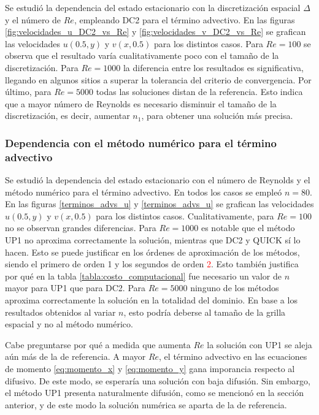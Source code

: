 \documentclass[aps,prb,twocolumn,superscriptaddress,floatfix,longbibliography,10pt]{revtex4-2}
\newif\ifptitle
\newif\ifpnumber
\newcounter{para}
\newcommand\ptitle[1]{\par\refstepcounter{para}
{\ifpnumber{\noindent\textcolor{lightgray}{\textbf{\thepara}}\indent}\fi}
{\ifptitle{\textbf{[{#1}]}}\fi}}
\begin{document}
\ptitle{Comparación DC2 vs n1 para distintos Re}
Se estudió la dependencia del estado estacionario con la discretización espacial $\Delta$ y el número de $Re$, empleando DC2 para el término advectivo. En las figuras \ref{fig:velocidades_u_DC2_vs_Re} y \ref{fig:velocidades_v_DC2_vs_Re} se grafican las velocidades $u(0.5,y)$ y $v(x,0.5)$ para los distintos casos. Para $Re = 100$ se observa que el resultado varía cualitativamente poco con el tamaño de la discretización. Para $Re = 1000$ la diferencia entre los resultados es significativa, llegando en algunos sitios a superar la tolerancia del criterio de convergencia. Por último, para $Re = 5000$ todas las soluciones distan de la referencia. Esto indica que a mayor número de Reynolds es necesario disminuir el tamaño de la discretización, es decir, aumentar $n_1$, para obtener una solución más precisa.

\subsubsection{Dependencia con el método numérico para el término advectivo \label{sec:termino_adv}}

\ptitle{Comparación cualitativa entre métodos numéricos para distintos Re}
Se estudió la dependencia del estado estacionario con el número de Reynolds y el método numérico para el término advectivo. En todos los casos se empleó $n = 80$. En las figuras \ref{terminos_advs_u} y \ref{terminos_advs_u} se grafican las velocidades $u(0.5,y)$ y $v(x,0.5)$ para los distintos casos. Cualitativamente, para $Re = 100$ no se observan grandes diferencias. Para $Re = 1000$ es notable que el método UP1 no aproxima correctamente la solución, mientras que DC2 y QUICK sí lo hacen. Esto se puede justificar en los órdenes de aproximación de los métodos, siendo el primero de orden 1 y los segundos de orden \textcolor{red}{2}. Esto también justifica por qué en la tabla \ref{tabla:costo_computacional} fue necesario un valor de $n$ mayor para UP1 que para DC2. Para $Re = 5000$ ninguno de los métodos aproxima correctamente la solución en la totalidad del dominio. En base a los resultados obtenidos al variar $n$, esto podría deberse al tamaño de la grilla espacial y no al método numérico.

Cabe preguntarse por qué a medida que aumenta $Re$ la solución con UP1 se aleja aún más de la de referencia. A mayor $Re$, el término advectivo en las ecuaciones de momento \ref{eq:momento_x} y \ref{eq:momento_y} gana imporancia respecto al difusivo. De este modo, se esperaría una solución con baja difusión. Sin embargo, el método UP1 presenta naturalmente difusión, como se mencionó en la sección anterior, y de este modo la solución numérica se aparta de la de referencia.
\end{document}
